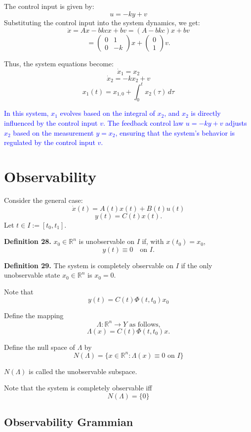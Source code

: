 \documentclass{article}
\begin{document}
The control input is given by:
\[
u = -ky + v
\]
Substituting the control input into the system dynamics, we get:
\[
\dot{x} = Ax - bkcx + bv = (A - bkc)x + bv
\]
\[
= \begin{pmatrix}
0 & 1 \\
0 & -k
\end{pmatrix} x + \begin{pmatrix}
0 \\
1
\end{pmatrix} v.
\]

Thus, the system equations become:
\[
\dot{x}_1 = x_2
\]
\[
\dot{x}_2 = -kx_2 + v
\]
\[
x_1(t) = x_{1,0} + \int_0^t x_2(\tau) \, d\tau
\]

\textcolor{blue}{In this system, $x_1$ evolves based on the integral of $x_2$, and $x_2$ is directly influenced by the control input $v$. The feedback control law $u = -ky + v$ adjusts $x_2$ based on the measurement $y = x_2$, ensuring that the system's behavior is regulated by the control input $v$.}

\section{Observability}

Consider the general case:
\[
\dot{x}(t) = A(t)x(t) + B(t)u(t)
\]
\[
y(t) = C(t)x(t).
\]
Let \( t \in I := [t_0, t_1] \).

\textbf{Definition 28.} \( x_0 \in \mathbb{R}^n \) is unobservable on \( I \) if, with \( x(t_0) = x_0 \),
\[
y(t) \equiv 0 \quad \text{on } I.
\]

\textbf{Definition 29.} The system is completely observable on \( I \) if the only unobservable state \( x_0 \in \mathbb{R}^n \) is \( x_0 = 0 \).

Note that
\[
y(t) = C(t)\Phi(t, t_0)x_0
\]

Define the mapping
\[
\Lambda : \mathbb{R}^n \rightarrow Y \text{ as follows,}
\]
\[
\Lambda(x) = C(t)\Phi(t, t_0)x.
\]

Define the null space of \(\Lambda\) by
\[
N(\Lambda) = \{ x \in \mathbb{R}^n : \Lambda(x) \equiv 0 \text{ on } I \}
\]

\(N(\Lambda)\) is called the unobservable subspace.

Note that the system is completely observable iff
\[
N(\Lambda) = \{ 0 \}
\]

\subsection{Observability Grammian}
\end{document}
